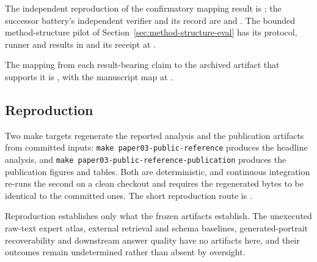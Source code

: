 The independent reproduction of the confirmatory mapping result is
; the
successor battery's independent verifier and its record are
 and
. The
bounded method-structure pilot of
Section~\ref{sec:method-structure-eval} has its protocol, runner and results
in  and its receipt at
.

The mapping from each result-bearing claim to the archived artifact that
supports it is , with the manuscript map at
.

\subsection{Reproduction}

Two make targets regenerate the reported analysis and the publication
artifacts from committed inputs: \texttt{make paper03-public-reference}
produces the headline analysis, and \texttt{make
paper03-public-reference-publication} produces the publication figures and
tables. Both are deterministic, and continuous integration re-runs the second
on a clean checkout and requires the regenerated bytes to be identical to the
committed ones. The short reproduction route is .

Reproduction establishes only what the frozen artifacts establish. The
unexecuted raw-text expert atlas, external retrieval and schema baselines,
generated-portrait recoverability and downstream answer quality have no
artifacts here, and their outcomes remain undetermined rather than absent by
oversight.

\endinput
